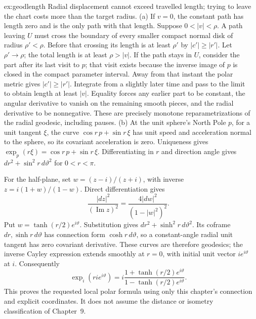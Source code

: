 \begin{solution}{ex:geodlength}
\idea Radial displacement cannot exceed travelled length; trying to leave the chart costs more than the target radius.
\writeup (a) If $v=0$, the constant path has length zero and is the only path with that length. Suppose $0<|v|<\rho$. A path leaving $U$ must cross the boundary of every smaller compact normal disk of radius $\rho'<\rho$. Before that crossing its length is at least $\rho'$ by $|c'|\ge|r'|$. Let $\rho'\to\rho$; the total length is at least $\rho>|v|$.
If the path stays in $U$, consider the part after its last visit to $p$; that visit exists because the inverse image of $p$ is closed in the compact parameter interval. Away from that instant the polar metric gives $|c'|\ge|r'|$. Integrate from a slightly later time and pass to the limit to obtain length at least $|v|$. Equality forces any earlier part to be constant, the angular derivative to vanish on the remaining smooth pieces, and the radial derivative to be nonnegative. These are precisely monotone reparametrizations of the radial geodesic, including pauses.
(b) At the unit sphere's North Pole $p$, for a unit tangent $\xi$, the curve $\cos r\,p+\sin r\,\xi$ has unit speed and acceleration normal to the sphere, so its covariant acceleration is zero. Uniqueness gives $\exp_p(r\xi)=\cos r\,p+\sin r\,\xi$. Differentiating in $r$ and direction angle gives $dr^2+\sin^2r\,d\vartheta^2$ for $0<r<\pi$.

For the half-plane, set $w=(z-i)/(z+i)$, with inverse $z=i(1+w)/(1-w)$. Direct differentiation gives
\[
\frac{|dz|^2}{(\operatorname{Im}z)^2}=\frac{4|dw|^2}{(1-|w|^2)^2}.
\]
Put $w=\tanh(r/2)e^{i\vartheta}$. Substitution gives $dr^2+\sinh^2r\,d\vartheta^2$. Its coframe $dr,\sinh r\,d\vartheta$ has connection form $\cosh r\,d\vartheta$, so a constant-angle radial unit tangent has zero covariant derivative. These curves are therefore geodesics; the inverse Cayley expression extends smoothly at $r=0$, with initial unit vector $i e^{i\vartheta}$ at $i$. Consequently
\[
\exp_i(ri e^{i\vartheta})
=i\frac{1+\tanh(r/2)e^{i\vartheta}}{1-\tanh(r/2)e^{i\vartheta}}.
\]
This proves the requested local polar formula using only this chapter's connection and explicit coordinates. It does not assume the distance or isometry classification of Chapter~9.
\end{solution}

